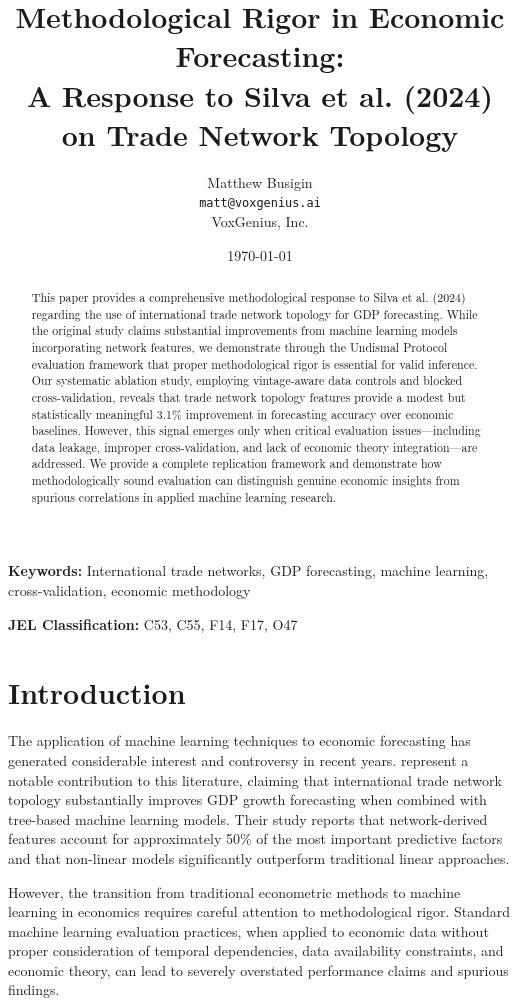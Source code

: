\documentclass[11pt,a4paper]{article}
\title{\textbf{Methodological Rigor in Economic Forecasting:\\A Response to Silva et al. (2024) on Trade Network Topology}}
\author{Matthew Busigin\\
\texttt{matt@voxgenius.ai}\\
VoxGenius, Inc.}
\date{\today}
\begin{document}
\maketitle

\begin{abstract}
This paper provides a comprehensive methodological response to Silva et al. (2024) regarding the use of international trade network topology for GDP forecasting. While the original study claims substantial improvements from machine learning models incorporating network features, we demonstrate through the Undismal Protocol evaluation framework that proper methodological rigor is essential for valid inference. Our systematic ablation study, employing vintage-aware data controls and blocked cross-validation, reveals that trade network topology features provide a modest but statistically meaningful 3.1\% improvement in forecasting accuracy over economic baselines. However, this signal emerges only when critical evaluation issues—including data leakage, improper cross-validation, and lack of economic theory integration—are addressed. We provide a complete replication framework and demonstrate how methodologically sound evaluation can distinguish genuine economic insights from spurious correlations in applied machine learning research.
\end{abstract}

\textbf{Keywords:} International trade networks, GDP forecasting, machine learning, cross-validation, economic methodology

\textbf{JEL Classification:} C53, C55, F14, F17, O47

\section{Introduction}

The application of machine learning techniques to economic forecasting has generated considerable interest and controversy in recent years. \citet{silva2024machine} represent a notable contribution to this literature, claiming that international trade network topology substantially improves GDP growth forecasting when combined with tree-based machine learning models. Their study reports that network-derived features account for approximately 50\% of the most important predictive factors and that non-linear models significantly outperform traditional linear approaches.

However, the transition from traditional econometric methods to machine learning in economics requires careful attention to methodological rigor. Standard machine learning evaluation practices, when applied to economic data without proper consideration of temporal dependencies, data availability constraints, and economic theory, can lead to severely overstated performance claims and spurious findings.
\end{document}
